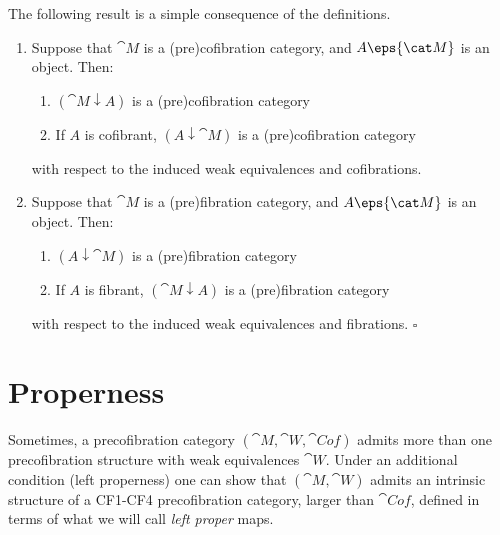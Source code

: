 The following result is a simple consequence of the definitions.

\begin{prop}
\label{prop:overcofcat}
\mbox{}
\begin{enumerate}
\item
Suppose that ${\cat M}$ is a (pre)cofibration category, and $A \eps {\cat M}$ is an object. Then:
\begin{enumerate}
\item
$({\cat M} \downarrow A)$ is a (pre)cofibration category
\item
If $A$ is cofibrant, $(A \downarrow {\cat M})$ is a (pre)cofibration category
\end{enumerate}
with respect to the induced weak equivalences and cofibrations.
\item
Suppose that ${\cat M}$ is a (pre)fibration category, and $A \eps {\cat M}$ is an object. Then:
\begin{enumerate}
\item
$(A \downarrow {\cat M})$ is a (pre)fibration category
\item
If $A$ is fibrant, $({\cat M} \downarrow A)$ is a (pre)fibration category 
\end{enumerate}
with respect to the induced weak equivalences and fibrations. $\square$
\end{enumerate}
\end{prop}

\section{Properness}
\label{sec:properness}
Sometimes, a precofibration category $({\cat M}, {\cat W}, {\cat Cof})$ admits more than one precofibration structure with weak equivalences ${\cat W}$. Under an additional condition (left properness) one can show that $({\cat M}, {\cat W})$ admits an intrinsic structure of a CF1-CF4 precofibration category, larger than ${\cat Cof}$, defined in terms of what we will call {\it left proper} maps. 

